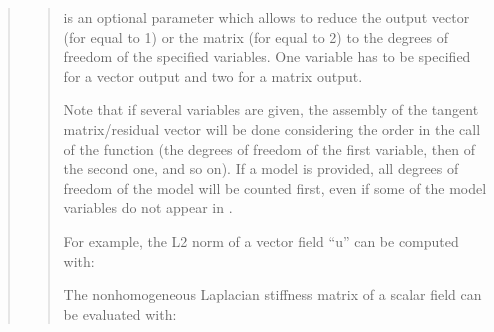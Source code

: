 \documentclass[a4paper,11pt,english]{sphinxmanual}
\begin{document}
\begin{quote}
\begin{quote}
\sphinxAtStartPar
{} is an optional parameter which allows to reduce the
output vector (for  equal to 1) or the matrix (for 
equal to 2) to the degrees of freedom of the specified variables.
One variable has to be specified for a vector output and two for a
matrix output.

\sphinxAtStartPar
Note that if several variables are given, the assembly of the
tangent matrix/residual vector will be done considering the order
in the call of the function (the degrees of freedom of the first
variable, then of the second one, and so on). If a model is provided,
all degrees of freedom of the model will be counted first, even if
some of the model variables do not appear in .

\sphinxAtStartPar
For example, the L2 norm of a vector field “u” can be computed with:

\begin{sphinxVerbatim}[commandchars=\\\{\}]
      

        
\end{sphinxVerbatim}

\sphinxAtStartPar
The nonhomogeneous Laplacian stiffness matrix of a scalar field can be evaluated with:

\begin{sphinxVerbatim}[commandchars=\\\{\}]
       

            
\end{sphinxVerbatim}
\end{quote}


\end{quote}
\end{document}
